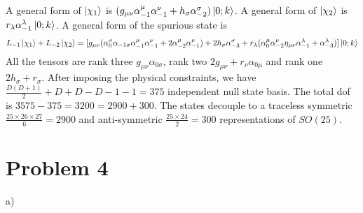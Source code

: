 \documentclass[12pt]{article}
\begin{document}
A general form of $\ket{\chi_1}$ is $(g_{\mu\nu}\alpha_{-1}^\mu\alpha_{-1}^\nu+h_\sigma\alpha_{-2}^\sigma)\ket{0;k}$. A general form of $\ket{\chi_2}$ is $r_\lambda\alpha_{-1}^\lambda\ket{0;k}$. A general form of the spurious state is \\
\begin{equation}
\begin{aligned}[t]
L_{-1}\ket{\chi_1}+L_{-2}\ket{\chi_2}=[g_{\mu\nu}(\alpha_0^\sigma\alpha_{-1 \sigma}\alpha_{-1}^\mu\alpha_{-1}^\nu+2\alpha_{-2}^\mu\alpha_{-1}^\nu)+2h_\sigma\alpha_{-3}^\sigma
+r_\lambda(\alpha_0^\mu\alpha_{-2}^\nu\eta_{\mu\nu}\alpha_{-1}^\lambda+\alpha_{-3}^\lambda)]\ket{0;k}
\end{aligned}
\end{equation}  
All the tensors are rank three $g_{\mu\nu}\alpha_{0 \sigma}$, rank two $2g_{\mu\nu}+r_\nu\alpha_{0 \mu}$ and rank one $2h_\sigma+r_\sigma$. After imposing the physical constraints, we have $\frac{D(D+1)}{2}+D+D-D-1-1=375$ independent null state basis. The total dof is $3575-375=3200=2900+300$. The states decouple to a traceless symmetric $\frac{25\times 26\times 27}{6}=2900$ and anti-symmetric $\frac{25\times 24}{2}=300$ representations of $SO(25)$.
\section{Problem 4}
\begin{paragraph}{a)}

\end{paragraph}
\end{document}
